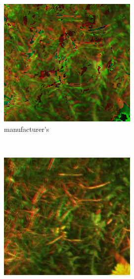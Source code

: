 \documentclass[a4paper,twoside]{article}
\begin{document}
\begin{figure}[ht]
\begin{subfigure}[b]{0.2\textwidth}
			\includegraphics[width=\linewidth]{../figures/results-manufacturer}
			\caption{manufacturer's}
			\label{fig:merged-correction-manufacturer}
		\end{subfigure}
		\\ \vspace{1em}
		\begin{subfigure}[b]{0.2\textwidth}
			\centering
			\includegraphics[width=\linewidth]{../figures/results-affine}

\end{subfigure}
\end{figure}
\end{document}

